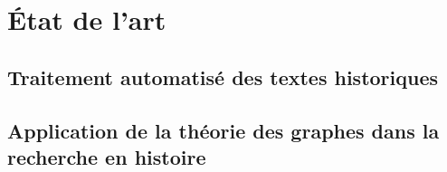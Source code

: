 
\section{État de l'art}
\subsection{Traitement automatisé des textes historiques}
\subsection{Application de la théorie des graphes dans la recherche en histoire}
